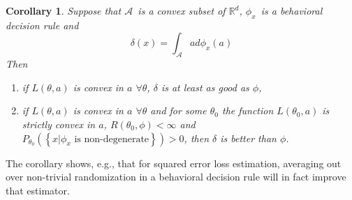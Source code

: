 \documentclass{article}
\newtheorem{corollary}[theorem]{Corollary}
\begin{document}
\begin{corollary}
\label{convexrandom2}Suppose that $\mathcal{A}$\ is a convex subset of $%
\mathbb{R}
^{d}$, $\phi_{x}$\ is a behavioral decision rule and%
\[
\delta\left(  x\right)  =\int_{\mathcal{A}}ad\phi_{x}\left(  a\right)
\]
Then

\begin{enumerate}
\item if $L\left(  \theta,a\right)  $ is convex in $a$ $\forall\theta$,
$\delta$ is at least as good as $\phi$,

\item if $L\left(  \theta,a\right)  $ is convex in $a$ $\forall\theta$ and for
some $\theta_{0}$ the function $L\left(  \theta_{0},a\right)  $ is strictly
convex in $a$, $R\left(  \theta_{0},\phi\right)  <\infty$ and $P_{\theta_{0}%
}\left(  \left\{  x|\phi_{x}\text{ is non-degenerate}\right\}  \right)  >0$,
then $\delta$ is better than $\phi$.
\end{enumerate}
\end{corollary}

The corollary shows, e.g., that for squared error loss estimation, averaging
out over non-trivial randomization in a behavioral decision rule will in fact
improve that estimator.
\end{document}
